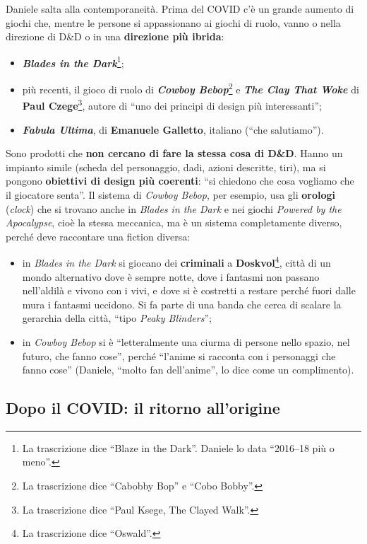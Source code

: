 Daniele salta alla contemporaneità. Prima del COVID c'è un grande aumento di
giochi che, mentre le persone si appassionano ai giochi di ruolo, vanno o nella
direzione di D\&D o in una \textbf{direzione più ibrida}:
\begin{itemize}
  \item \textbf{\emph{Blades in the Dark}}\footnote{La trascrizione dice
        ``Blaze in the Dark''. Daniele lo data ``2016--18 più o meno''.};
  \item più recenti, il gioco di ruolo di \textbf{\emph{Cowboy
        Bebop}}\footnote{La trascrizione dice ``Cabobby Bop'' e ``Cobo
        Bobby''.} e \textbf{\emph{The Clay That Woke}} di \textbf{Paul
        Czege}\footnote{La trascrizione dice ``Paul Ksege, The Clayed Walk''.},
        autore di ``uno dei principi di design più interessanti'';
  \item \textbf{\emph{Fabula Ultima}}, di \textbf{Emanuele Galletto}, italiano
        (``che salutiamo'').
\end{itemize}
Sono prodotti che \textbf{non cercano di fare la stessa cosa di D\&D}. Hanno un
impianto simile (scheda del personaggio, dadi, azioni descritte, tiri), ma si
pongono \textbf{obiettivi di design più coerenti}: ``si chiedono che cosa vogliamo
che il giocatore senta''. Il sistema di \emph{Cowboy Bebop}, per esempio, usa
gli \textbf{orologi} (\emph{clock}) che si trovano anche in \emph{Blades in the
Dark} e nei giochi \emph{Powered by the Apocalypse}, cioè la stessa meccanica,
ma è un sistema completamente diverso, perché deve raccontare una fiction
diversa:
\begin{itemize}
  \item in \emph{Blades in the Dark} si giocano dei \textbf{criminali} a
        \textbf{Doskvol}\footnote{La trascrizione dice ``Oswald''.}, città di un
        mondo alternativo dove è sempre notte, dove i fantasmi non passano
        nell'aldilà e vivono con i vivi, e dove si è costretti a restare perché
        fuori dalle mura i fantasmi uccidono. Si fa parte di una banda che cerca
        di scalare la gerarchia della città, ``tipo \emph{Peaky Blinders}'';
  \item in \emph{Cowboy Bebop} si è ``letteralmente una ciurma di persone nello
        spazio, nel futuro, che fanno cose'', perché ``l'anime si racconta con i
        personaggi che fanno cose'' (Daniele, ``molto fan dell'anime'', lo dice
        come un complimento).
\end{itemize}

\subsection{Dopo il COVID: il ritorno all'origine}

